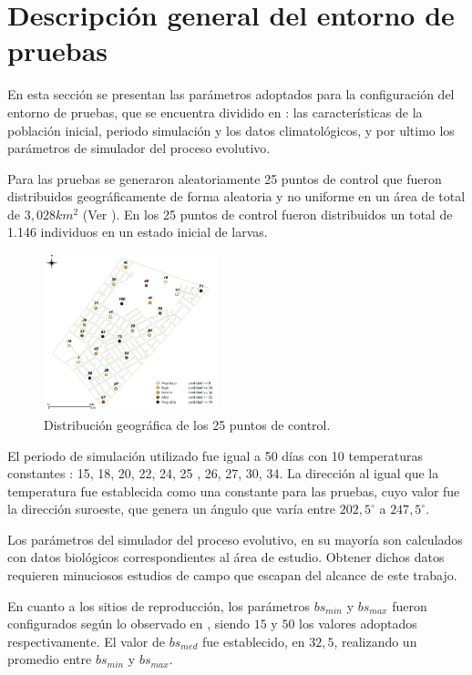 \section{Descripción general del entorno de pruebas}
En esta sección se presentan las parámetros adoptados para la configuración del entorno de
pruebas, que se encuentra dividido en : las características de la población inicial, periodo
simulación y los datos climatológicos, y por ultimo los parámetros de simulador del proceso
evolutivo.

Para las pruebas se generaron aleatoriamente 25 puntos de control que fueron distribuidos
geográficamente de forma aleatoria y no uniforme en un área de total de $3,028 km^{2}$
(Ver ). En los 25 puntos de control fueron distribuidos un total de
1.146 individuos en un estado inicial de larvas.

\begin{figure}[!t]
    \centering
    \includegraphics[width=0.45\textwidth]{../book/capitulo-6/graphics/extension-poblacion.png}
    \caption{\label{fig:distribucion-puntos}Distribución geográfica de los 25 puntos de control.}
\end{figure}

El periodo de simulación utilizado fue igual a 50 días con 10 temperaturas constantes :
15\textcelsius , 18\textcelsius , 20\textcelsius , 22\textcelsius , 24\textcelsius , 25\textcelsius
, 26\textcelsius , 27\textcelsius , 30\textcelsius , 34\textcelsius. La dirección al igual que la
temperatura fue establecida como una constante para las pruebas, cuyo valor fue la dirección
suroeste, que genera un ángulo que varía entre $202,5^{\circ}$ a $247,5^{\circ}$.

Los parámetros del simulador del proceso evolutivo, en su mayoría son calculados con datos
biológicos correspondientes al área de estudio. Obtener dichos datos requieren minuciosos estudios
de campo que escapan del alcance de este trabajo.

En cuanto a los sitios de reproducción, los parámetros $bs_{min}$ y $bs_{max}$ fueron
configurados según lo observado en \cite{otero2006stochastic, otero2008stochastic}, siendo $15$ y
$50$ los valores adoptados respectivamente.  El valor de $bs_{med}$ fue establecido, en $32,5$,
realizando un promedio entre $bs_{min}$ y $bs_{max}$.

